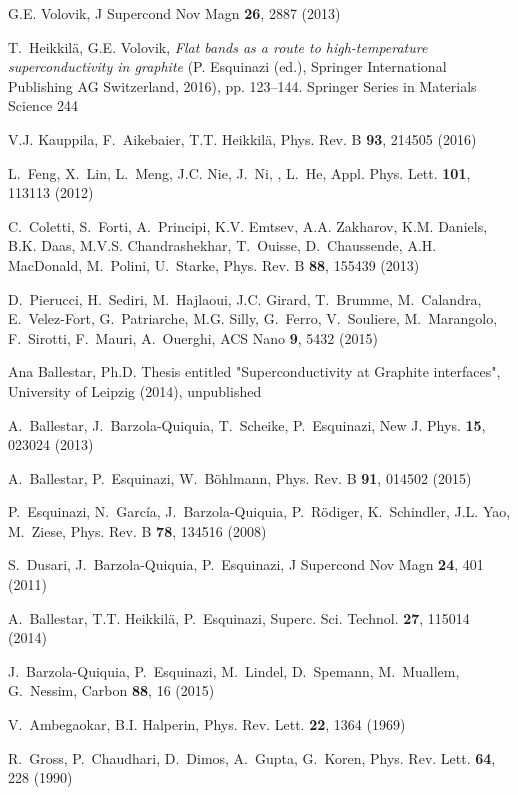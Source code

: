 \documentclass[aps,dvipsnames,twocolumn,floatfix,amsmath]{revtex4-1}
\begin{document}
\begin{thebibliography}{10}
G.E. Volovik, J Supercond Nov Magn \textbf{26}, 2887 (2013)

T.~Heikkil\"a, G.E. Volovik, \emph{Flat bands as a route to
high-temperature
  superconductivity in graphite} (P. Esquinazi (ed.), Springer International
  Publishing AG Switzerland, 2016), pp. 123--144.
\newblock Springer Series in Materials Science 244

V.J. Kauppila, F.~Aikebaier, T.T. Heikkil\"a, Phys. Rev. B
\textbf{93}, 214505
  (2016)

L.~Feng, X.~Lin, L.~Meng, J.C. Nie, J.~Ni, , L.~He, Appl. Phys.
Lett.
  \textbf{101}, 113113 (2012)

C.~Coletti, S.~Forti, A.~Principi, K.V. Emtsev, A.A. Zakharov,
K.M. Daniels,
  B.K. Daas, M.V.S. Chandrashekhar, T.~Ouisse, D.~Chaussende, A.H. MacDonald,
  M.~Polini, U.~Starke, Phys. Rev. B \textbf{88}, 155439 (2013)

D.~Pierucci, H.~Sediri, M.~Hajlaoui, J.C. Girard, T.~Brumme,
M.~Calandra,
  E.~Velez-Fort, G.~Patriarche, M.G. Silly, G.~Ferro, V.~Souliere,
  M.~Marangolo, F.~Sirotti, F.~Mauri, A.~Ouerghi, ACS Nano \textbf{9}, 5432
  (2015)

Ana Ballestar, Ph.D. Thesis entitled "Superconductivity at
Graphite
  interfaces", University of Leipzig (2014), unpublished

A.~Ballestar, J.~Barzola-Quiquia, T.~Scheike, P.~Esquinazi, New J.
Phys.
  \textbf{15}, 023024 (2013)

A.~Ballestar, P.~Esquinazi, W.~B\"ohlmann, Phys. Rev. B
\textbf{91}, 014502
  (2015)

P.~Esquinazi, N.~Garc\'ia, J.~Barzola-Quiquia, P.~R\"odiger,
K.~Schindler, J.L.
  Yao, M.~Ziese, Phys. Rev. B \textbf{78}, 134516 (2008)

S.~Dusari, J.~Barzola-Quiquia, P.~Esquinazi, J Supercond Nov Magn
\textbf{24},
  401 (2011)

A.~Ballestar, T.T. Heikkil\"a, P.~Esquinazi, Superc. Sci. Technol.
\textbf{27},
  115014 (2014)

J.~Barzola-Quiquia, P.~Esquinazi, M.~Lindel, D.~Spemann,
M.~Muallem, G.~Nessim,
  Carbon \textbf{88}, 16 (2015)

V.~Ambegaokar, B.I. Halperin, Phys. Rev. Lett. \textbf{22}, 1364
(1969)

R.~Gross, P.~Chaudhari, D.~Dimos, A.~Gupta, G.~Koren, Phys. Rev.
Lett.
  \textbf{64}, 228 (1990)


\end{thebibliography}
\end{document}
